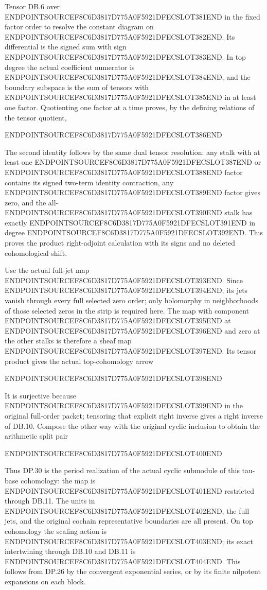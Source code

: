Tensor DB.6 over ENDPOINTSOURCEF8C6D3817D775A0F5921DFECSLOT381END in the fixed factor order to resolve the constant diagram on ENDPOINTSOURCEF8C6D3817D775A0F5921DFECSLOT382END. Its differential is the signed sum with sign ENDPOINTSOURCEF8C6D3817D775A0F5921DFECSLOT383END. In top degree the actual coefficient numerator is ENDPOINTSOURCEF8C6D3817D775A0F5921DFECSLOT384END, and the boundary subspace is the sum of tensors with ENDPOINTSOURCEF8C6D3817D775A0F5921DFECSLOT385END in at least one factor. Quotienting one factor at a time proves, by the defining relations of the tensor quotient,

ENDPOINTSOURCEF8C6D3817D775A0F5921DFECSLOT386END

The second identity follows by the same dual tensor resolution: any stalk with at least one ENDPOINTSOURCEF8C6D3817D775A0F5921DFECSLOT387END or ENDPOINTSOURCEF8C6D3817D775A0F5921DFECSLOT388END factor contains its signed two-term identity contraction, any ENDPOINTSOURCEF8C6D3817D775A0F5921DFECSLOT389END factor gives zero, and the all-ENDPOINTSOURCEF8C6D3817D775A0F5921DFECSLOT390END stalk has exactly ENDPOINTSOURCEF8C6D3817D775A0F5921DFECSLOT391END in degree ENDPOINTSOURCEF8C6D3817D775A0F5921DFECSLOT392END. This proves the product right-adjoint calculation with its signs and no deleted cohomological shift.

Use the actual full-jet map ENDPOINTSOURCEF8C6D3817D775A0F5921DFECSLOT393END. Since ENDPOINTSOURCEF8C6D3817D775A0F5921DFECSLOT394END, its jets vanish through every full selected zero order; only holomorphy in neighborhoods of those selected zeros in the strip is required here. The map with component ENDPOINTSOURCEF8C6D3817D775A0F5921DFECSLOT395END at ENDPOINTSOURCEF8C6D3817D775A0F5921DFECSLOT396END and zero at the other stalks is therefore a sheaf map ENDPOINTSOURCEF8C6D3817D775A0F5921DFECSLOT397END. Its tensor product gives the actual top-cohomology arrow

ENDPOINTSOURCEF8C6D3817D775A0F5921DFECSLOT398END

It is surjective because ENDPOINTSOURCEF8C6D3817D775A0F5921DFECSLOT399END in the original full-order packet; tensoring that explicit right inverse gives a right inverse of DB.10. Compose the other way with the original cyclic inclusion to obtain the arithmetic split pair

ENDPOINTSOURCEF8C6D3817D775A0F5921DFECSLOT400END

Thus DP.30 is the period realization of the actual cyclic submodule of this tau-base cohomology: the map is ENDPOINTSOURCEF8C6D3817D775A0F5921DFECSLOT401END restricted through DB.11. The units in ENDPOINTSOURCEF8C6D3817D775A0F5921DFECSLOT402END, the full jets, and the original cochain representative boundaries are all present. On top cohomology the scaling action is ENDPOINTSOURCEF8C6D3817D775A0F5921DFECSLOT403END; its exact intertwining through DB.10 and DB.11 is ENDPOINTSOURCEF8C6D3817D775A0F5921DFECSLOT404END. This follows from DP.26 by the convergent exponential series, or by its finite nilpotent expansions on each block.

